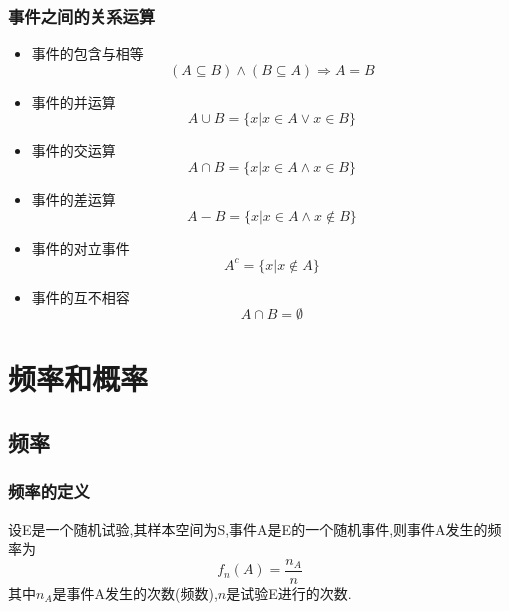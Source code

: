 \documentclass{ctexart}
\begin{document}
\subsubsection{事件之间的关系运算}
\begin{itemize}
	\item 事件的包含与相等
	      \begin{equation}
		      (A\subseteq B) \land (B\subseteq A) \Rightarrow A=B
	      \end{equation}
	\item 事件的并运算
	      \begin{equation}
		      A\cup B=\{x|x\in A\lor x\in B\}
	      \end{equation}
	\item 事件的交运算
	      \begin{equation}
		      A\cap B=\{x|x\in A\land x\in B\}
	      \end{equation}
	\item 事件的差运算
	      \begin{equation}
		      A-B=\{x|x\in A\land x\notin B\}
	      \end{equation}
	\item 事件的对立事件
	      \begin{equation}
		      A^c=\{x|x\notin A\}
	      \end{equation}
	\item 事件的互不相容
	      \begin{equation}
		      A\cap B=\emptyset
	      \end{equation}
\end{itemize}
\section{频率和概率}
\subsection{频率}
\subsubsection{频率的定义}
设E是一个随机试验,其样本空间为S,事件A是E的一个随机事件,则事件A发生的频率为
\begin{equation}
	f_n(A)=\frac{n_A}{n}
\end{equation}
其中$n_A$是事件A发生的次数(频数),$n$是试验E进行的次数.\\
\end{document}
